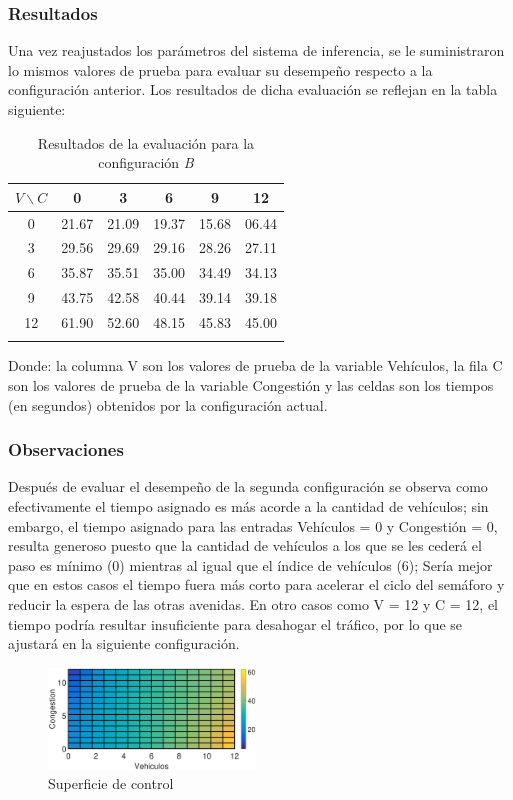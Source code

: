 \pagebreak
\subsubsection{Resultados}
Una vez reajustados los parámetros del sistema de inferencia, se le suministraron lo mismos valores de prueba para evaluar su desempeño respecto a la configuración anterior. Los resultados de dicha evaluación se reflejan en la tabla siguiente:

\begin{longtable}[c]{cccccc} \toprule
	$V \backslash C$ &  0 & 3 & 6 & 9 & 12 \\ \midrule
	0 & 21.67 & 21.09 & 19.37 & 15.68 & 06.44 \\
	3 & 29.56 & 29.69 & 29.16 & 28.26 & 27.11 \\
	6 & 35.87 & 35.51 & 35.00 & 34.49 & 34.13 \\
	9 & 43.75 & 42.58 & 40.44 & 39.14 & 39.18 \\
	12& 61.90 & 52.60 & 48.15 & 45.83 & 45.00 \\
	\caption{Resultados de la evaluación para la configuración \textit{B}}
\end{longtable}

Donde: la columna V son los valores de prueba de la variable Vehículos, la fila C son los valores de  prueba de la variable Congestión y las celdas son los tiempos (en segundos) obtenidos por la configuración actual.

\subsubsection{Observaciones}
\begin{multicols}{2}
Después de evaluar el desempeño de la segunda configuración se observa como efectivamente el tiempo asignado es más acorde a la cantidad de vehículos; sin embargo, el tiempo asignado para las entradas Vehículos = 0 y Congestión = 0, resulta generoso puesto que la cantidad de vehículos a los que se les cederá el paso es mínimo (0) mientras al igual que el índice de vehículos (6); Sería mejor que en estos casos el tiempo fuera más corto para acelerar el ciclo del semáforo y reducir la espera de las otras avenidas. En otro casos como V = 12 y C = 12, el tiempo podría resultar insuficiente para desahogar el tráfico, por lo que se ajustará en la siguiente configuración.

\begin{figure}[H]
	\includegraphics[width=0.49\textwidth]{Surfaces/Surface2D_B.eps}
	\caption{Superficie de control}
\end{figure}

\end{multicols}


